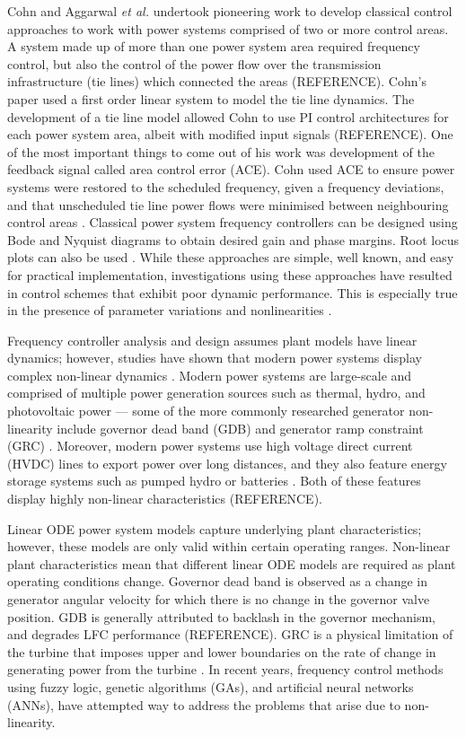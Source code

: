 Cohn \cite{Cohn1971} and Aggarwal \textit{et al.} \cite{Aggarwal1968, Aggarwal1968a} undertook pioneering work to develop classical control approaches to work with power systems comprised of two or more control areas. A system made up of more than one power system area required frequency control, but also the control of the power flow over the transmission infrastructure (tie lines) which connected the areas (REFERENCE). Cohn's paper used a first order linear system to model the tie line dynamics. The development of a tie line model allowed Cohn to use PI control architectures for each power system area, albeit with modified input signals (REFERENCE). One of the most important things to come out of his work was development of the feedback signal called area control error (ACE). Cohn used ACE to ensure power systems were restored to the scheduled frequency, given a frequency deviations, and that unscheduled tie line power flows were minimised between neighbouring control areas \cite{Cohn1956}. Classical power system frequency controllers can be designed using Bode and Nyquist diagrams to obtain desired gain and phase margins. Root locus plots can also be used \cite{Ogat2010}. While these approaches are simple, well known, and easy for practical implementation, investigations using these approaches have resulted in control schemes that exhibit poor dynamic performance. This is especially true in the presence of parameter variations and nonlinearities \cite{Kundur1994, Elgerd1970, Bechert1977}.

Frequency controller analysis and design assumes plant models have linear dynamics; however, studies have shown that modern power systems display complex non-linear dynamics \cite{Concordia1957, Kwatny1975, Elgerd1994, Morsali2014}. Modern power systems are large-scale and comprised of multiple power generation sources such as thermal, hydro, and photovoltaic power --- some of the more commonly researched generator non-linearity include governor dead band (GDB) \cite{Concordia1957} and generator ramp constraint (GRC) \cite{Kwatny1975, Elgerd1994}. Moreover, modern power systems use high voltage direct current (HVDC) lines to export power over long distances, and they also feature energy storage systems such as pumped hydro or batteries \cite{Bevrani2011, Glover2012, Kothari2011, Kundur1994}. Both of these features display highly non-linear characteristics (REFERENCE).

Linear ODE power system models capture underlying plant characteristics; however, these models are only valid within certain operating ranges. Non-linear plant characteristics mean that different linear ODE models are required as plant operating conditions change. Governor dead band is observed as a change in generator angular velocity for which there is no change in the governor valve position. GDB is generally attributed to backlash in the governor mechanism, and degrades LFC performance (REFERENCE). GRC is a physical limitation of the turbine that imposes upper and lower boundaries on the rate of change in generating power from the turbine \cite{Morsali2014}. In recent years, frequency control methods using fuzzy logic, genetic algorithms (GAs), and artificial neural networks (ANNs), have attempted way to address the problems that arise due to non-linearity.

